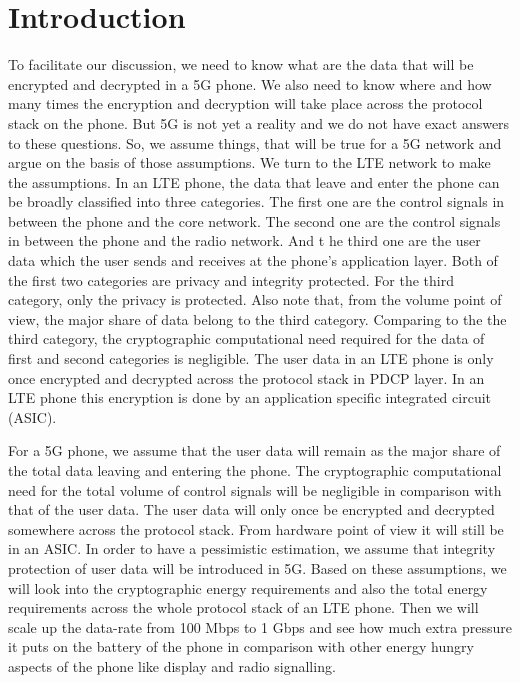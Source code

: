 \documentclass[lnicst,sechang,a4paper]{svmultln}
\begin{document}
\section{Introduction}
\label{intro} To facilitate our discussion, we need to know what are the data that will be encrypted and decrypted in a 5G phone. We also need to know where and how many times the encryption and decryption will take place across the protocol stack on the phone. But 5G is not yet a reality and we do not have exact answers to these questions. So, we assume things, that will be true for a 5G network and argue on the basis of those assumptions. We turn to the LTE network to make the assumptions. In an LTE phone, the data that leave and enter the phone can be broadly classified into three categories. The first one are the control signals in between the phone and the core network. The second one are the control signals in between the phone and the radio network. And t
\label{sec:aes}he third one are the user data which the user sends and receives at the phone's application layer. Both of the first two categories are privacy and integrity protected. For the third category, only the privacy is protected. Also note that, from the volume point of view, the major share of data belong to the third category. Comparing to the the third category, the cryptographic computational need required for the data of first and second categories is negligible. The user data in an LTE phone is only once encrypted and decrypted across the protocol stack in PDCP layer. In an LTE phone this encryption is done by an application specific integrated circuit (ASIC).

For a 5G phone, we assume that the user data will remain as the major share of the total data leaving and entering the phone. The cryptographic computational need for the total volume of control signals will be negligible in comparison with that of the user data. The user data will only once be encrypted and decrypted somewhere across the protocol stack. From hardware point of view it will still be in an ASIC. In order to have a pessimistic estimation, we assume that integrity protection of user data will be introduced in 5G. Based on these assumptions, we will look into the cryptographic energy requirements and also the total energy requirements across the whole protocol stack of an LTE phone. Then we will scale up the data-rate from 100 Mbps to 1 Gbps and see how much extra pressure it puts on the battery of the phone in comparison with other energy hungry aspects of the phone like display and radio signalling.
\end{document}
